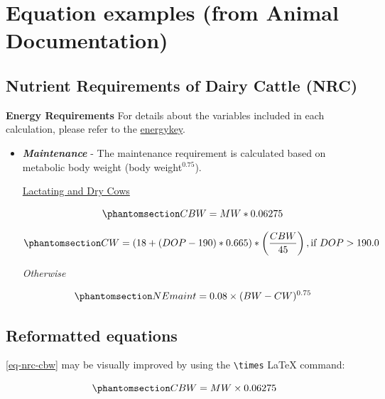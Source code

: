 \documentclass[
  letterpaper,
  oneside,
  openany]{scrbook}
\begin{document}

\chapter{Equation examples (from Animal
Documentation)}\label{equation-examples-from-animal-documentation}

\section{Nutrient Requirements of Dairy Cattle (NRC)}\label{sec-nrc}

\textbf{Energy Requirements} For details about the variables included in
each calculation, please refer to the
\href{energy\%20requirements\%20key}{energykey}.

\begin{itemize}
\item
  \textbf{\emph{Maintenance}} - The maintenance requirement is
  calculated based on metabolic body weight (body weight\(^{0.75}\)).

  \ul{Lactating and Dry Cows}

  \begin{equation}\protect\phantomsection\label{eq-nrc-cbw}{
  CBW = MW * 0.06275
  }\end{equation}

  \begin{equation}\protect\phantomsection\label{eq-nrc-cw}{
  CW = {(18 + (DOP - 190) * 0.665) * \left(\frac{CBW}{45}\right), \text{if } DOP > 190.0}
  }\end{equation}

  \emph{Otherwise}

  \begin{equation}\protect\phantomsection\label{eq-nrc-ne-maint}{
  NEmaint = 0.08 \times (BW - CW)^{0.75}
  }\end{equation}
\end{itemize}

\section{Reformatted equations}\label{reformatted-equations}

\ref{eq-nrc-cbw} may be visually improved by using the
\texttt{\textbackslash{}times} LaTeX command:

\begin{equation}\protect\phantomsection\label{eq-nrc-cbw-times}{
CBW = MW \times 0.06275
}\end{equation}
\end{document}

